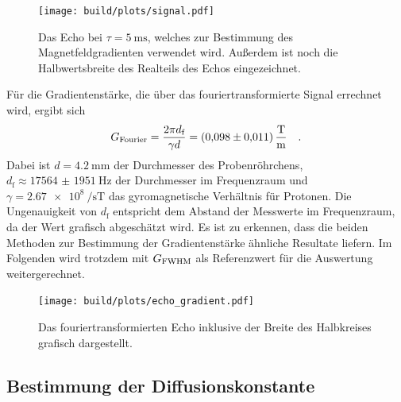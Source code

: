 \begin{figure}[H]
  \centering
  \texttt{[image: build/plots/signal.pdf]}
  \caption{Das Echo bei $\tau = \SI{5}{\milli\second}$, welches zur Bestimmung des Magnetfeldgradienten verwendet wird. 
  Außerdem ist noch die Halbwertsbreite des Realteils des Echos eingezeichnet.}
\label{img:four1}
\end{figure}

\noindent
Für die Gradientenstärke, die über das fouriertransformierte Signal errechnet wird, ergibt sich
\begin{equation*}
  G_\t{Fourier} = \frac{2\pi d_\text{f}}{\gamma d} = \SI{0.098(11)}{\tesla\per\metre} \quad.
\end{equation*}
Dabei ist  $d = \SI{4.2}{\milli\metre}$ \cite{V49} der Durchmesser des Probenröhrchens, $d_\text{f} \approx \SI{17564(1951)}{\hertz}$ der Durchmesser im Frequenzraum und
$\gamma = \SI{2.67e8}{\per\second\tesla}$ \cite{gyro} das gyromagnetische Verhältnis für Protonen.
Die Ungenauigkeit von $d_\text{f}$ entspricht dem Abstand der Messwerte im Frequenzraum, da der Wert grafisch abgeschätzt wird. 
Es ist zu erkennen, dass die beiden Methoden zur Bestimmung der Gradientenstärke ähnliche Resultate liefern. 
Im Folgenden wird trotzdem mit $G_\t{FWHM}$ als Referenzwert für die Auswertung weitergerechnet.

\begin{figure}[H]
  \centering
  \texttt{[image: build/plots/echo\_gradient.pdf]}
  \caption{Das fouriertransformierten Echo inklusive der Breite des Halbkreises grafisch dargestellt. }
\label{img:four2}
\end{figure}


\subsection{Bestimmung der Diffusionskonstante}


